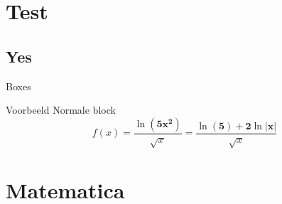 


\begin{frame}[plain]%
\titlepage
\end{frame}

\section{Test}
\subsection{Yes}
\begin{frame}{Boxes}
%
\begin{block}{Voorbeeld}
Normale block
\begin{equation}
f(x)=\dfrac{\ln(\boldsymbol{5x^2})}{\sqrt{x}}=\dfrac{\ln(\boldsymbol{5})+\boldsymbol{2}\ln\boldsymbol{\left|x\right|}}{\sqrt{x}}
\end{equation}
\end{block}
%
\end{frame}
%
\section{Matematica}
